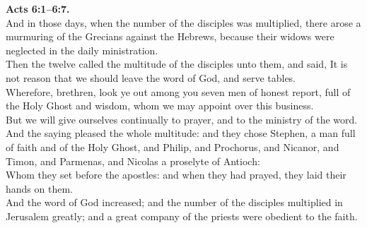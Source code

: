 \documentclass[10pt]{article} %
\begin{document}
{\begin{minipage}[t]{0.45\textwidth}
\textbf{Acts 6:1--6:7.}\\
And in those days, when the number of the disciples was multiplied, there arose a murmuring of the Grecians against the Hebrews, because their widows were neglected in the daily ministration.\\
Then the twelve called the multitude of the disciples unto them, and said, It is not reason that we should leave the word of God, and serve tables.\\
Wherefore, brethren, look ye out among you seven men of honest report, full of the Holy Ghost and wisdom, whom we may appoint over this business.\\
But we will give ourselves continually to prayer, and to the ministry of the word.\\
And the saying pleased the whole multitude: and they chose Stephen, a man full of faith and of the Holy Ghost, and Philip, and Prochorus, and Nicanor, and Timon, and Parmenas, and Nicolas a proselyte of Antioch:\\
Whom they set before the apostles: and when they had prayed, they laid their hands on them.\\
And the word of God increased; and the number of the disciples multiplied in Jerusalem greatly; and a great company of the priests were obedient to the faith.\\

\end{minipage}}
\vspace*{\fill}
\newpage
\Huge%
\vspace*{\fill}
\begin{spacing}{1.3}%
\end{spacing}
\vspace*{\fill}
\end{document}
